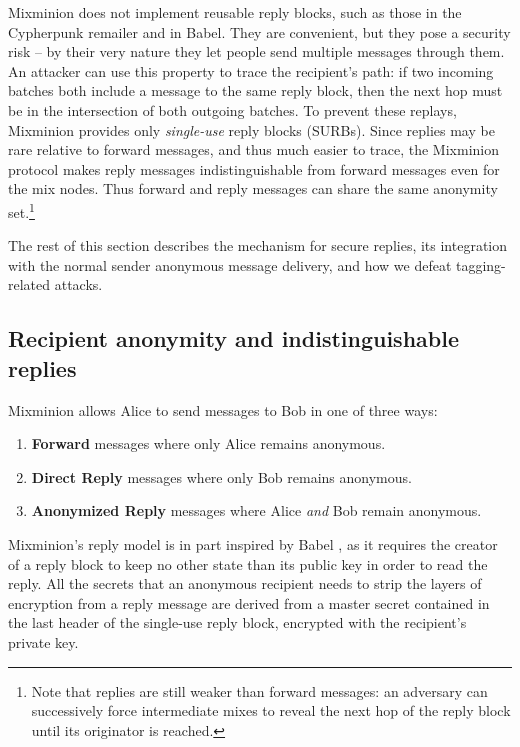 \documentclass[final,inpress,inline]{ieee}
\begin{document}
Mixminion does not implement reusable reply blocks, such as those in
the Cypherpunk 
remailer and in Babel. They are convenient, but they pose a security
risk -- by their very nature they let people send multiple
messages through them.  An attacker can use this property to
trace the recipient's path: if two incoming batches both include a
message to the same reply block, then the next hop must be in the
intersection of both outgoing batches.  To prevent these replays,
Mixminion provides only \emph{single-use} reply blocks (SURBs). Since
replies may be rare relative to forward messages, and thus
much easier to trace, the Mixminion protocol makes reply messages
indistinguishable from forward messages even for the mix nodes. Thus
forward and reply messages can share the same anonymity
set.\footnote{Note that replies are still weaker than forward messages:
an adversary can successively force intermediate mixes to reveal the
next hop of the reply block until its originator is reached.}

The rest of this section describes the mechanism for secure replies,
its integration with the normal sender anonymous message delivery, and
how we defeat tagging-related attacks.  

\subsection{Recipient anonymity and indistinguishable replies}
\label{subsec:replies}
\label{subsec:header-swap}

Mixminion allows Alice to send messages to Bob in one of three ways:

\begin{enumerate}
\item \textbf{Forward} messages where only Alice remains anonymous.
\item \textbf{Direct Reply} messages where only Bob remains anonymous.
\item \textbf{Anonymized Reply} messages where Alice \emph{and} Bob
   remain anonymous.
\end{enumerate}

Mixminion's reply model is in part inspired by Babel \cite{babel}, as it
requires the creator of a reply block to keep no other state than its public
key in order to read the reply.  All the secrets that an anonymous recipient
needs to strip the layers of encryption from a reply message are derived from
a master secret contained in the last header of the single-use reply block,
encrypted with the recipient's private key.
\end{document}
